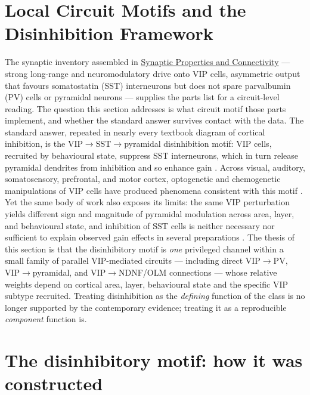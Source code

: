 \documentclass[11pt]{article}
\let\origrightarrow\rightarrow
\def\rightarrow{\ensuremath{\origrightarrow}}
\begin{document}
\section{Local Circuit Motifs and the Disinhibition Framework}
\label{sec:07_disinhibition_framework}

The synaptic inventory assembled in \href{/synaptic-properties}{Synaptic Properties and Connectivity} --- strong long-range and neuromodulatory drive onto VIP cells, asymmetric output that favours somatostatin (SST) interneurons but does not spare parvalbumin (PV) cells or pyramidal neurons --- supplies the parts list for a circuit-level reading. The question this section addresses is what circuit motif those parts implement, and whether the standard answer survives contact with the data. The standard answer, repeated in nearly every textbook diagram of cortical inhibition, is the VIP\rightarrow SST\rightarrow pyramidal disinhibition motif: VIP cells, recruited by behavioural state, suppress SST interneurons, which in turn release pyramidal dendrites from inhibition and so enhance gain \citep{Pfeffer2013, Pi2013, Lee2013, Fu2014, Karnani2016a}. Across visual, auditory, somatosensory, prefrontal, and motor cortex, optogenetic and chemogenetic manipulations of VIP cells have produced phenomena consistent with this motif \citep{Pi2013, Lee2013, Fu2014, Zhang2014, Kuchibhotla2017, Cichon2017, Williams2019, Veit2023}. Yet the same body of work also exposes its limits: the same VIP perturbation yields different sign and magnitude of pyramidal modulation across area, layer, and behavioural state, and inhibition of SST cells is neither necessary nor sufficient to explain observed gain effects in several preparations \citep{Pakan2016, Dipoppa2018, Garrett2020, Stachniak2021}. The thesis of this section is that the disinhibitory motif is \textit{one} privileged channel within a small family of parallel VIP-mediated circuits --- including direct VIP\rightarrow PV, VIP\rightarrow pyramidal, and VIP\rightarrow NDNF/OLM connections --- whose relative weights depend on cortical area, layer, behavioural state and the specific VIP subtype recruited. Treating disinhibition as the \textit{defining} function of the class is no longer supported by the contemporary evidence; treating it as a reproducible \textit{component} function is.

\section{The disinhibitory motif: how it was constructed}
\end{document}
